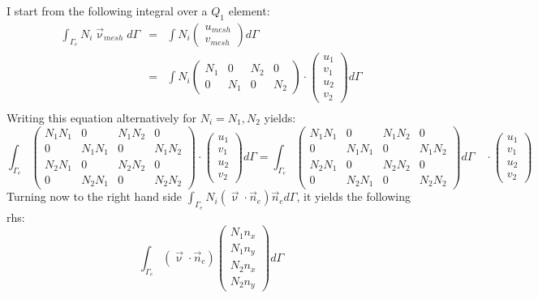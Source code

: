 I start from the following integral over a $Q_1$ element:
\begin{eqnarray}
\int_{\Gamma_e} N_i \vec{\upnu}_{mesh} d\Gamma
&=& \int N_i \left( \begin{array}{c} u_{mesh} \\ v_{mesh} \end{array} \right) d\Gamma \\
&=& \int N_i 
\left( \begin{array}{cccc}  N_1 & 0 & N_2 & 0 \\ 0 & N_1 & 0 & N_2  \end{array}\right)\cdot
\left( \begin{array}{c} u_1 \\ v_1 \\ u_2 \\ v_2 \end{array} \right) d\Gamma \\
\end{eqnarray}
Writing this equation alternatively for $N_i=N_1,N_2$ yields:
\[
\int_{\Gamma_e} 
\left( \begin{array}{cccc}  
N_1N_1 & 0 & N_1N_2 & 0 \\ 
0 & N_1N_1 & 0 & N_1N_2 \\
N_2N_1 & 0 & N_2N_2 & 0 \\ 
0 & N_2N_1 & 0 & N_2N_2 
\end{array}\right)
\cdot \left( \begin{array}{c} u_1 \\ v_1 \\ u_2 \\ v_2 \end{array} \right) 
d\Gamma 
=
\int_{\Gamma_e} 
\left( \begin{array}{cccc}  
N_1N_1 & 0 & N_1N_2 & 0 \\ 
0 & N_1N_1 & 0 & N_1N_2 \\
N_2N_1 & 0 & N_2N_2 & 0 \\ 
0 & N_2N_1 & 0 & N_2N_2 
\end{array}\right)
d\Gamma \quad 
\cdot \left( \begin{array}{c} u_1 \\ v_1 \\ u_2 \\ v_2 \end{array} \right) 
\]
Turning now to the right hand side %
$\int_{\Gamma_e} N_i   (\vec{\upnu}\cdot\vec{n}_e)\vec{n}_e  d\Gamma$, it yields the following rhs:
\[
\int_{\Gamma_e}   (\vec{\upnu}\cdot\vec{n}_e)
\left(\begin{array}{c}
N_1 n_x \\ N_1 n_y \\ N_2 n_x \\ N_2 n_y
\end{array}\right)
 d\Gamma
\]
